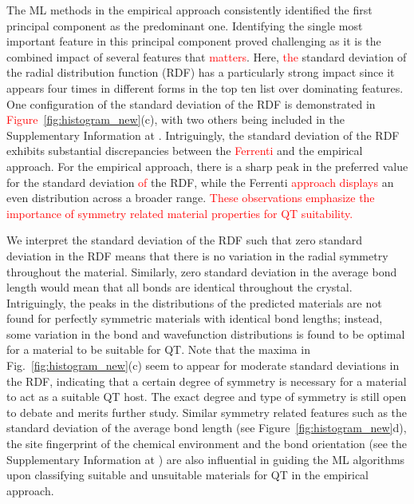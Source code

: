 \documentclass[superscriptaddress,unsortedaddress,
 amsmath,amssymb,
 aps,
]{revtex4-2}
\newcommand{\mrk}[1]{\textcolor{red}{#1}}
\begin{document}
The ML methods in the empirical approach consistently identified the first principal component as the predominant one. Identifying the single most important feature in this principal component proved challenging as it is the combined impact of several features that \mrk{matters}. 
Here, \mrk{the} standard deviation of the radial distribution function (RDF) has a  particularly strong impact since it appears four times in different forms in the top ten list over dominating features. One configuration of the standard deviation of the RDF is demonstrated in \mrk{Figure}~\ref{fig:histogram_new}(c), with two others being included in the Supplementary Information at \cite{supplementary}. Intriguingly, the standard deviation of the RDF exhibits substantial discrepancies between the \mrk{Ferrenti} and the empirical approach. For the empirical approach, there is a sharp peak in the preferred value for the standard deviation \mrk{of} the RDF, while the Ferrenti \mrk{approach displays} an even distribution across a broader range. 
\mrk{These observations emphasize the importance of symmetry related material properties for QT suitability. } 

We interpret the standard deviation  of the RDF such that zero standard deviation in the RDF means that there is no variation in the radial symmetry throughout the material. Similarly, zero standard deviation in the average bond length would mean that all bonds are identical throughout the crystal. Intriguingly, the peaks in the distributions of the predicted materials are not found for perfectly symmetric materials with identical bond lengths; instead, some variation in the bond and wavefunction distributions is found to be optimal for a material to be suitable for QT.  
Note that the maxima in  Fig.~\ref{fig:histogram_new}(c) seem to appear for moderate standard deviations in the RDF, indicating that a certain degree of symmetry is necessary for a material to act as a suitable QT host. The exact degree and type of symmetry is still open to debate and merits further study. 
Similar symmetry related features such as the standard deviation of the average bond length (see Figure~\ref{fig:histogram_new}d), the site fingerprint of the chemical environment and the bond orientation (see the Supplementary Information at \cite{supplementary}) are also influential in guiding the ML algorithms upon classifying suitable and unsuitable materials for QT in the empirical approach. 
\end{document}
